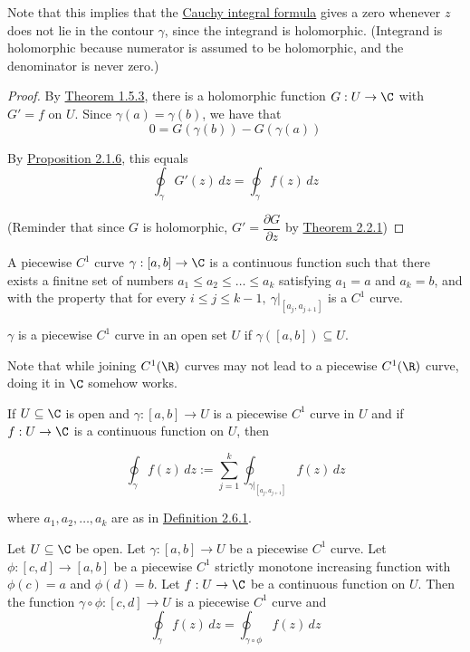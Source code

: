Note that this implies that the \href{e50677f}{Cauchy integral formula} gives a
zero whenever $z$ does not lie in the contour $\gamma$, since the integrand is
holomorphic. (Integrand is holomorphic because numerator is assumed to be
holomorphic, and the denominator is never zero.)

\begin{proof}
  By \href{e7808d1}{Theorem 1.5.3}, there is a holomorphic function
  $G:U\to\C$ with $G'=f$ on $U$. Since $\gamma(a)=\gamma(b)$, we have
  that
  $$
    0=G(\gamma(b))-G(\gamma(a))
  $$

  By \href{c526c09}{Proposition 2.1.6}, this equals
  $$\oint_\gamma G'(z)\,dz=\oint_\gamma f(z)\,dz$$

  (Reminder that since $G$ is holomorphic, $G'=\dfrac{\partial
    G}{\partial z}$ by \href{f75e43c}{Theorem 2.2.1})
\end{proof}

\label{baf22ac}

A piecewise $C^1$ curve $\gamma:[a,b]\to\C$ is a continuous function such that
there exists a finitne set of numbers $a_1\leq a_2\leq\ldots\leq a_k$
satisfying $a_1=a$ and $a_k=b$, and with the property that for every $i\leq
j\leq k-1,\ \gamma|_{[a_j,a_{j+1}]}$ is a $C^1$ curve.

$\gamma$ is a piecewise $C^1$ curve in an open set $U$ if
$\gamma([a,b])\subseteq U$.

Note that while joining $C^1(\R)$ curves may not lead to a piecewise $C^1(\R)$
curve, doing it in $\C$ somehow works.

\label{a99ad34}

If $U\subseteq\C$ is open and $\gamma:[a,b]\to U$ is a piecewise $C^1$ curve in
$U$ and if $f:U\to\C$ is a continuous function on $U$, then

$$
  \oint_\gamma f(z)\,dz:=\sum_{j=1}^k\oint_{\gamma|_{[a_j,a_{j+1}]}}
  f(z)\,dz
$$

where $a_1,a_2,\ldots,a_k$ are as in \href{baf22ac}{Definition 2.6.1}.

\label{b6b6d51}

Let $U\subseteq\C$ be open. Let $\gamma:[a,b]\to U$ be a piecewise $C^1$ curve.
Let $\phi:[c,d]\to[a,b]$ be a piecewise $C^1$ strictly monotone increasing
function with $\phi(c)=a$ and $\phi(d)=b$. Let $f:U\to\C$ be a continuous
function on $U$. Then the function $\gamma\circ\phi:[c,d]\to U$ is a piecewise
$C^1$ curve and
$$\oint_\gamma f(z)\,dz=\oint_{\gamma\circ\phi}f(z)\,dz$$

